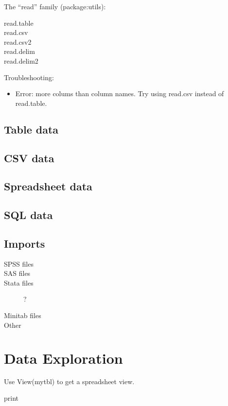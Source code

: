 The ``read'' family (package:utils):

\begin{description}
  \item [read.table]
  \item [read.csv]
  \item [read.csv2]
  \item [read.delim]
  \item [read.delim2]
\end{description}

Troubleshooting:
\begin{itemize}
\item Error: more colums than column names.  Try using read.csv instead of read.table.
\end{itemize}

\subsection{Table data}
\subsection{CSV data}
\subsection{Spreadsheet data}
\subsection{SQL data}
\subsection{Imports}

\begin{description}
  \item [SPSS files]
  \item [SAS files]
  \item [Stata files] ?
  \item [Minitab files]
  \item [Other]
\end{description}

\section{Data Exploration}

Use View(mytbl) to get a spreadsheet view.

print

